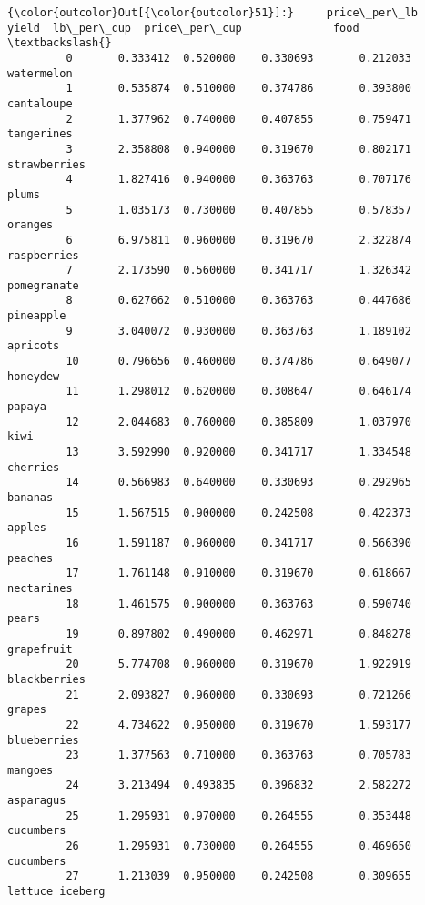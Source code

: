 \documentclass[11pt]{article}
\begin{document}
\begin{Verbatim}[commandchars=\\\{\}]
{\color{outcolor}Out[{\color{outcolor}51}]:}     price\_per\_lb     yield  lb\_per\_cup  price\_per\_cup              food  \textbackslash{}
         0       0.333412  0.520000    0.330693       0.212033        watermelon   
         1       0.535874  0.510000    0.374786       0.393800        cantaloupe   
         2       1.377962  0.740000    0.407855       0.759471        tangerines   
         3       2.358808  0.940000    0.319670       0.802171      strawberries   
         4       1.827416  0.940000    0.363763       0.707176             plums   
         5       1.035173  0.730000    0.407855       0.578357           oranges   
         6       6.975811  0.960000    0.319670       2.322874       raspberries   
         7       2.173590  0.560000    0.341717       1.326342       pomegranate   
         8       0.627662  0.510000    0.363763       0.447686         pineapple   
         9       3.040072  0.930000    0.363763       1.189102          apricots   
         10      0.796656  0.460000    0.374786       0.649077          honeydew   
         11      1.298012  0.620000    0.308647       0.646174            papaya   
         12      2.044683  0.760000    0.385809       1.037970              kiwi   
         13      3.592990  0.920000    0.341717       1.334548          cherries   
         14      0.566983  0.640000    0.330693       0.292965           bananas   
         15      1.567515  0.900000    0.242508       0.422373            apples   
         16      1.591187  0.960000    0.341717       0.566390           peaches   
         17      1.761148  0.910000    0.319670       0.618667        nectarines   
         18      1.461575  0.900000    0.363763       0.590740             pears   
         19      0.897802  0.490000    0.462971       0.848278        grapefruit   
         20      5.774708  0.960000    0.319670       1.922919      blackberries   
         21      2.093827  0.960000    0.330693       0.721266            grapes   
         22      4.734622  0.950000    0.319670       1.593177       blueberries   
         23      1.377563  0.710000    0.363763       0.705783           mangoes   
         24      3.213494  0.493835    0.396832       2.582272         asparagus   
         25      1.295931  0.970000    0.264555       0.353448         cucumbers   
         26      1.295931  0.730000    0.264555       0.469650         cucumbers   
         27      1.213039  0.950000    0.242508       0.309655   lettuce iceberg   

\end{Verbatim}
\end{document}
